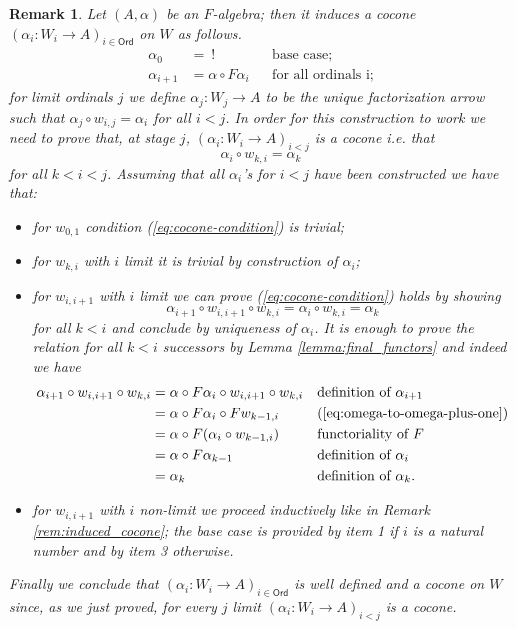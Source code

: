 \documentclass[letterpaper, 11pt, oneside]{memoir}
\theoremstyle{myteo}
\newtheorem{remark}[theorem]{Remark}
\numberwithin{equation}{section}
\newcommand{\Ord}{\textsf{Ord}}
\begin{document}
\begin{remark}
  \label{rem:induce-transfinite-cocone}
  Let \((A, \alpha)\) be an \(F\)-algebra; then it induces a cocone \((\alpha_i : W_i \to A)_{i \in \Ord}\) on \(W\) as follows.
  \begin{align*}
    \alpha_0 &=\ ! && \text{base case};\\
    \alpha_{i+1} &= \alpha \circ F\alpha_i && \text{for all ordinals i};
  \end{align*}
  for limit ordinals \(j\) we define \(\alpha_{j} : W_j \to A\) to be the unique factorization arrow such that \(\alpha_j \circ w_{i,j} = \alpha_i\) for all \(i < j\).
  In order for this construction to work we need to prove that, at stage \(j\), \((\alpha_i : W_i \to A)_{i < j}\) is a cocone i.e. that
  \begin{equation}
    \label{eq:cocone-condition}
    \alpha_i \circ w_{k, i} = \alpha_{k}
  \end{equation}
  for all \(k < i < j\).
  Assuming that all \(\alpha_i\)'s for \(i < j\) have been constructed we have that:
  \begin{itemize}
  \item[1.] for \(w_{0,1}\) condition (\ref{eq:cocone-condition}) is trivial;
  \item[2.] for \(w_{k, i}\) with \(i\) limit it is trivial by construction of \(\alpha_{i}\);
  \item[3.] for \(w_{i, i+1}\) with \(i\) limit we can prove (\ref{eq:cocone-condition}) holds by showing
    \[\alpha_{i+1} \circ w_{i, i+1} \circ w_{k, i} = \alpha_i \circ w_{k, i} =  \alpha_{k}\]
    for all \(k < i\) and conclude by uniqueness of \(\alpha_i\).
    It is enough to prove the relation for all \(k < i\) successors by Lemma \ref{lemma:final_functors} and indeed we have
    \begin{align*}
      \alpha_{i+1} \circ w_{i, i+1} \circ w_{k, i} &= \alpha \circ F\alpha_i \circ w_{i, i+1} \circ w_{k, i} && \text{definition of \(\alpha_{i+1}\)}\\
                                      &= \alpha \circ F\alpha_i \circ Fw_{k-1, i} && \text{(\ref{eq:omega-to-omega-plus-one})} \\
                                      &= \alpha \circ F(\alpha_i \circ w_{k-1, i}) && \text{functoriality of \(F\)}\\
                                      &= \alpha \circ F\alpha_{k-1} && \text{definition of \(\alpha_{i}\)}\\
                                      &= \alpha_k && \text{definition of \(\alpha_k\)}.
    \end{align*}
  \item[4.] for \(w_{i,i+1}\) with \(i\) non-limit we proceed inductively like in Remark \ref{rem:induced_cocone}; the base case is provided by item 1 if \(i\) is a natural number and by item 3 otherwise.
  \end{itemize}
  Finally we conclude that \((\alpha_i : W_i \to A)_{i \in \Ord}\) is well defined and a cocone on \(W\) since, as we just proved, for every \(j\) limit \((\alpha_i : W_i \to A)_{i < j}\) is a cocone.
\end{remark}
\end{document}
